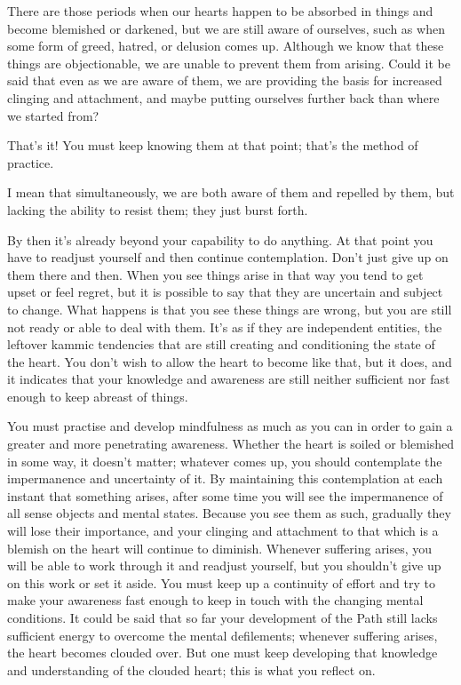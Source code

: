 
\question{}
There are those periods when our hearts happen to be absorbed in
things and become blemished or darkened, but we are still aware of
ourselves, such as when some form of greed, hatred, or delusion comes
up. Although we know that these things are objectionable, we are unable
to prevent them from arising. Could it be said that even as we are aware
of them, we are providing the basis for increased clinging and
attachment, and maybe putting ourselves further back than where we
started from?

That's it! You must keep knowing them at that point; 
that's the method of practice. 

I mean that simultaneously, we are both aware of them and repelled by
them, but lacking the ability to resist them; they just burst forth. 

By then it's already beyond your capability to do anything. At that
point you have to readjust yourself and then continue contemplation. 
Don't just give up on them there and then. When you see things arise in
that way you tend to get upset or feel regret, but it is possible to say
that they are uncertain and subject to change. What happens is that you
see these things are wrong, but you are still not ready or able to deal
with them. It's as if they are independent entities, the leftover kammic
tendencies that are still creating and conditioning the state of the
heart. You don't wish to allow the heart to become like that, but it
does, and it indicates that your knowledge and awareness are still
neither sufficient nor fast enough to keep abreast of things. 

You must practise and develop mindfulness as much as you can in order to
gain a greater and more penetrating awareness. Whether the heart is
soiled or blemished in some way, it doesn't matter; whatever comes up, 
you should contemplate the impermanence and uncertainty of it. By
maintaining this contemplation at each instant that something arises, 
after some time you will see the impermanence of all sense objects and
mental states. Because you see them as such, gradually they will lose
their importance, and your clinging and attachment to that which is a
blemish on the heart will continue to diminish. Whenever suffering
arises, you will be able to work through it and readjust yourself, but
you shouldn't give up on this work or set it aside. You must keep up a
continuity of effort and try to make your awareness fast enough to keep
in touch with the changing mental conditions. It could be said that so
far your development of the Path still lacks sufficient energy to
overcome the mental defilements; whenever suffering arises, the heart
becomes clouded over. But one must keep developing that knowledge and
understanding of the clouded heart; this is what you reflect on. 

